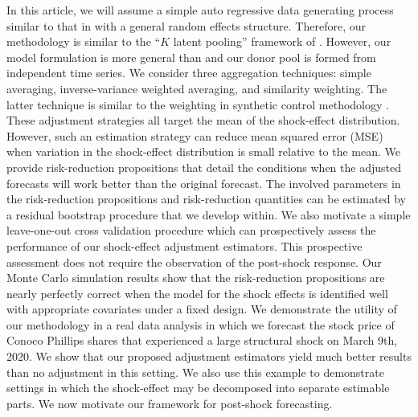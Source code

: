 \documentclass[11pt]{article}
\theoremstyle{definition}
\begin{document}
In this article, we will assume a simple auto regressive data generating process similar to that in \citet{blundell1998initial} with a general random effects structure. Therefore, our methodology is similar to the ``$K$ latent pooling'' framework of \cite{ramaswamy1993empirical}. However, our model formulation is more general than \cite{ramaswamy1993empirical} and our donor pool is formed from independent time series.
We consider three aggregation techniques: simple averaging, inverse-variance weighted averaging, and similarity weighting. The latter technique is similar to the weighting in synthetic control methodology \citep{abadie2010synthetic}.  These adjustment strategies all target the mean of the shock-effect distribution. However, such an estimation strategy can reduce mean squared error (MSE) when variation in the shock-effect distribution is small relative to the mean. We provide risk-reduction propositions that detail the conditions when the adjusted forecasts will work better than the original forecast. The involved parameters in the risk-reduction propositions and risk-reduction quantities can be estimated by a residual bootstrap procedure that we develop within. %
We also motivate a simple leave-one-out cross validation procedure which can prospectively assess the performance of our shock-effect adjustment estimators. This prospective assessment does not require the observation of the post-shock response. Our Monte Carlo simulation results show that the risk-reduction propositions are nearly perfectly correct when the model for the shock effects is identified well with appropriate covariates under a fixed design. We demonstrate the utility of our methodology in a real data analysis in which we forecast the stock price of Conoco Phillips shares that experienced a large structural shock on March 9th, 2020. We show that our proposed adjustment estimators yield much better results than no adjustment in this setting. We also use this example to demonstrate settings in which the shock-effect may be decomposed into separate estimable parts. We now motivate our framework for post-shock forecasting.
\end{document}
